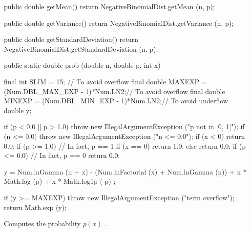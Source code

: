 \begin{code}
\begin{hide}
   public double getMean() {
      return NegativeBinomialDist.getMean (n, p);
   }

   public double getVariance() {
      return NegativeBinomialDist.getVariance (n, p);
   }

   public double getStandardDeviation() {
      return NegativeBinomialDist.getStandardDeviation (n, p);
   }\end{hide}

   public static double prob (double n, double p, int x)\begin{hide} {
      final int SLIM = 15;           // To avoid overflow
      final double MAXEXP = (Num.DBL_MAX_EXP - 1)*Num.LN2;// To avoid overflow
      final double MINEXP = (Num.DBL_MIN_EXP - 1)*Num.LN2;// To avoid underflow
      double y;

      if (p < 0.0 || p > 1.0)
         throw new IllegalArgumentException ("p not in [0, 1]");
      if (n <= 0.0)
         throw new IllegalArgumentException ("n <= 0.0");
      if (x < 0)
         return 0.0;
      if (p >= 1.0) {                // In fact, p == 1
         if (x == 0)
            return 1.0;
         else
            return 0.0;
      }
      if (p <= 0.0)                  // In fact, p == 0
         return 0.0;

      y = Num.lnGamma (n + x) - (Num.lnFactorial (x) + Num.lnGamma (n))
          + n * Math.log (p) + x * Math.log1p (-p) ;

      if (y >= MAXEXP)
         throw new IllegalArgumentException ("term overflow");
      return Math.exp (y);
   }\end{hide}
\end{code}
  \begin{tabb}
   Computes  the probability $p(x)$%
.
  \end{tabb}
